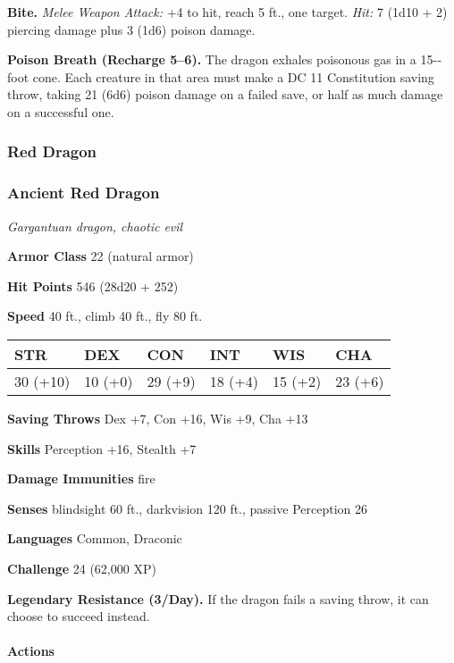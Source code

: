 \documentclass[
]{article}
\begin{document}
\textbf{Bite.} \emph{Melee Weapon Attack:} +4 to hit, reach 5 ft., one
target. \emph{Hit:} 7 (1d10 + 2) piercing damage plus 3 (1d6) poison
damage.

\textbf{Poison Breath (Recharge 5--6).} The dragon exhales poisonous gas
in a 15-­‐foot cone. Each creature in that area must make a DC 11
Constitution saving throw, taking 21 (6d6) poison damage on a failed
save, or half as much damage on a successful one.

\hypertarget{red-dragon}{%
\subsubsection{Red Dragon}\label{red-dragon}}

\hypertarget{ancient-red-dragon}{%
\subsubsection{Ancient Red Dragon}\label{ancient-red-dragon}}

\emph{Gargantuan dragon, chaotic evil}

\textbf{Armor Class} 22 (natural armor)

\textbf{Hit Points} 546 (28d20 + 252)

\textbf{Speed} 40 ft., climb 40 ft., fly 80 ft.

\begin{longtable}[]{@{}llllll@{}}
\toprule
STR & DEX & CON & INT & WIS & CHA\tabularnewline
\midrule
\endhead
30 (+10) & 10 (+0) & 29 (+9) & 18 (+4) & 15 (+2) & 23
(+6)\tabularnewline
\bottomrule
\end{longtable}

\textbf{Saving Throws} Dex +7, Con +16, Wis +9, Cha +13

\textbf{Skills} Perception +16, Stealth +7

\textbf{Damage Immunities} fire

\textbf{Senses} blindsight 60 ft., darkvision 120 ft., passive
Perception 26

\textbf{Languages} Common, Draconic

\textbf{Challenge} 24 (62,000 XP)

\textbf{Legendary Resistance (3/Day).} If the dragon fails a saving
throw, it can choose to succeed instead.

\hypertarget{actions-35}{%
\paragraph{Actions}\label{actions-35}}
\end{document}
